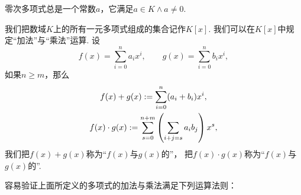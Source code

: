 零次多项式总是一个常数\(a\)，它满足\(a \in K \land a \neq 0\).

我们把数域\(K\)上的所有一元多项式组成的集合记作\(K[x]\).
我们可以在\(K[x]\)中规定“加法”与“乘法”运算.
设\begin{equation*}
	f(x) = \sum_{i=0}^n a_i x^i, \qquad
	g(x) = \sum_{i=0}^n b_i x^i,
\end{equation*}
如果\(n \ge m\)，那么\begin{gather}
	f(x) + g(x) := \sum_{i=0}^n (a_i+b_i) x^i, \\
	f(x) \cdot g(x) := \sum_{s=0}^{n+m} \left( \sum_{i+j=s} a_i b_j \right) x^s,
\end{gather}
我们把\(f(x)+g(x)\)称为“\(f(x)\)与\(g(x)\)的”，
把\(f(x) \cdot g(x)\)称为“\(f(x)\)与\(g(x)\)的”.

容易验证上面所定义的多项式的加法与乘法满足下列运算法则：
